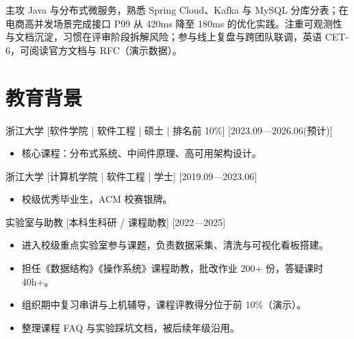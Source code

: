 \documentclass{resume-photo}
\begin{document}

\ResumeTitle

\noindent 主攻 Java 与分布式微服务，熟悉 Spring Cloud、Kafka 与 MySQL 分库分表；在电商高并发场景完成接口 P99 从 420ms 降至 180ms 的优化实践。注重可观测性与文档沉淀，习惯在评审阶段拆解风险；参与线上复盘与跨团队联调，英语 CET-6，可阅读官方文档与 RFC（演示数据）。

\section{教育背景}
\ResumeItem
{浙江大学}
[\textnormal{软件学院 | 软件工程 | 硕士 | 排名前 10\%}]
[2023.09—2026.06(预计)]

\begin{itemize}
  \item 核心课程：分布式系统、中间件原理、高可用架构设计。
\end{itemize}

\ResumeItem
{浙江大学}
[\textnormal{计算机学院 | 软件工程 | 学士}]
[2019.09—2023.06]

\begin{itemize}
  \item 校级优秀毕业生，ACM 校赛银牌。
\end{itemize}


\ResumeItem
{实验室与助教}
[\textnormal{本科生科研 / 课程助教}]
[2022—2025]

\begin{itemize}
  \item 进入校级重点实验室参与课题，负责数据采集、清洗与可视化看板搭建。
  \item 担任《数据结构》《操作系统》课程助教，批改作业 200+ 份，答疑课时 40h+。
  \item 组织期中复习串讲与上机辅导，课程评教得分位于前 10\%（演示）。
  \item 整理课程 FAQ 与实验踩坑文档，被后续年级沿用。
\end{itemize}
\end{document}
